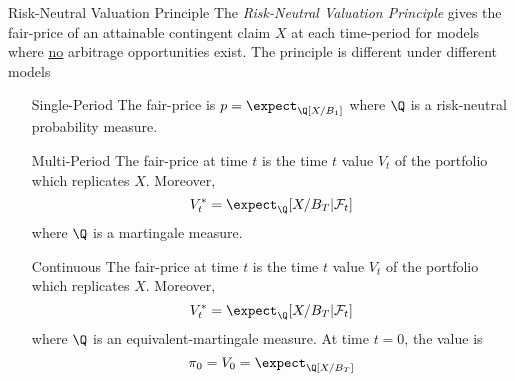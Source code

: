\documentclass[11pt,a4paper]{article}
\begin{document}
  \begin{theorem}{Risk-Neutral Valuation Principle}\label{the_risk_neutral_valuation_principle}
    The \textit{Risk-Neutral Valuation Principle} gives the fair-price of an attainable contingent claim $X$ at each time-period for models where \underline{no} arbitrage opportunities exist. The principle is different under different models
    \begin{itemize}
      \item[Single-Period] The fair-price is $p=\expect_\Q[X/B_1]$ where $\Q$ is a risk-neutral probability measure.
      \item[Multi-Period] The fair-price at time $t$ is the time $t$ value $V_t$ of the portfolio which replicates $X$. Moreover,
      \[ V_t^*=\expect_\Q[X/B_T|\mathcal{F}_t] \]
      where $\Q$ is a martingale measure.
      \item[Continuous] The fair-price at time $t$ is the time $t$ value $V_t$ of the portfolio which replicates $X$. Moreover,
      \[ V_t^*=\expect_\Q[X/B_T|\mathcal{F}_t] \]
      where $\Q$ is an equivalent-martingale measure. At time $t=0$, the value is
      \[ \pi_0=V_0=\expect_\Q[X/B_T] \]
    \end{itemize}
  \end{theorem}
\end{document}
